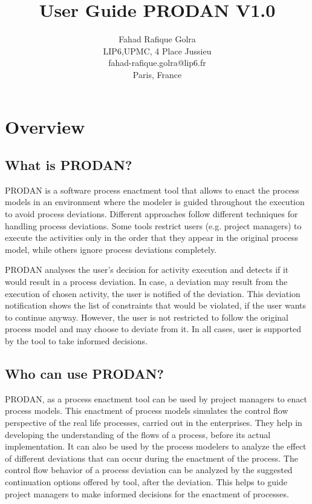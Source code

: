 \documentclass[twoside,a4paper]{refart}
\title{User Guide PRODAN V1.0}
\author{Fahad Rafique Golra \\
LIP6,UPMC, 4 Place Jussieu\\
fahad-rafique.golra@lip6.fr\\
Paris, France}
\date{}
\begin{document}


\cleardoublepage
\newpage
\thispagestyle{empty}
\mbox{}

\tableofcontents

\newpage


\section{Overview}

\subsection{What is PRODAN?}
PRODAN is a software process enactment tool that allows to enact the process models in an environment where the modeler is guided throughout the execution to avoid process deviations.  Different approaches follow different techniques for handling process deviations.  Some tools restrict users (e.g. project managers) to execute the activities only in the order that they appear in the original process model, while others ignore process deviations completely.  

PRODAN analyses the user's decision for activity execution and detects if it would result in a process deviation.   In case, a deviation may result from the execution of chosen activity, the user is notified of the deviation.  This deviation notification shows the list of constraints that would be violated, if the user wants to continue anyway.  However, the user is not restricted to follow the original process model and may choose to deviate from it.  In all cases, user is supported by the tool to take informed decisions.

\subsection{Who can use PRODAN?}
PRODAN, as a process enactment tool can be used by project managers to enact process models. This enactment of process models simulates the control flow perspective of the real life processes, carried out in the enterprises.  They help in developing the understanding of the flows of a process, before its actual implementation.  It can also be used by the process modelers to analyze the effect of different deviations that can occur during the enactment of the process.  The control flow behavior of a process deviation can be analyzed by the suggested continuation options offered by tool, after the deviation.  This helps to guide project managers to make informed decisions for the enactment of processes.  
\end{document}
